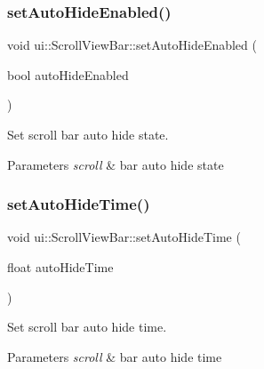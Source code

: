 \subsubsection{\texorpdfstring{set\+Auto\+Hide\+Enabled()}{setAutoHideEnabled()}\hspace{0.1cm}{\footnotesize\ttfamily [2/2]}}
{\footnotesize\ttfamily void ui\+::\+Scroll\+View\+Bar\+::set\+Auto\+Hide\+Enabled (\begin{DoxyParamCaption}\item[{bool}]{auto\+Hide\+Enabled }\end{DoxyParamCaption})}



Set scroll bar auto hide state. 


\begin{DoxyParams}{Parameters}
{\em scroll} & bar auto hide state \\
\hline
\end{DoxyParams}
\mbox{\label{classui_1_1ScrollViewBar_a98512e5a256ba825ed8d0b2c8a5905c9}} 
\subsubsection{\texorpdfstring{set\+Auto\+Hide\+Time()}{setAutoHideTime()}\hspace{0.1cm}{\footnotesize\ttfamily [1/2]}}
{\footnotesize\ttfamily void ui\+::\+Scroll\+View\+Bar\+::set\+Auto\+Hide\+Time (\begin{DoxyParamCaption}\item[{float}]{auto\+Hide\+Time }\end{DoxyParamCaption})\hspace{0.3cm}{\ttfamily [inline]}}



Set scroll bar auto hide time. 


\begin{DoxyParams}{Parameters}
{\em scroll} & bar auto hide time \\
\hline
\end{DoxyParams}
\mbox{\label{classui_1_1ScrollViewBar_a98512e5a256ba825ed8d0b2c8a5905c9}} 
